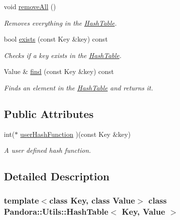 \begin{DoxyCompactItemize}
void \hyperlink{classPandora_1_1Utils_1_1HashTable_af541b0c8a7ababea86db5cfda3da0a2e}{removeAll} ()
\begin{DoxyCompactList}\small\item\em Removes everything in the \hyperlink{classPandora_1_1Utils_1_1HashTable}{HashTable}. \item\end{DoxyCompactList}\item 
bool \hyperlink{classPandora_1_1Utils_1_1HashTable_a61bb5ce54f3380c10edebb59cac114cd}{exists} (const Key \&key) const 
\begin{DoxyCompactList}\small\item\em Checks if a key exists in the \hyperlink{classPandora_1_1Utils_1_1HashTable}{HashTable}. \item\end{DoxyCompactList}\item 
Value \& \hyperlink{classPandora_1_1Utils_1_1HashTable_ab1aae3564898a1de7870930f7e678de0}{find} (const Key \&key) const 
\begin{DoxyCompactList}\small\item\em Finds an element in the \hyperlink{classPandora_1_1Utils_1_1HashTable}{HashTable} and returns it. \item\end{DoxyCompactList}\end{DoxyCompactItemize}
\subsection*{Public Attributes}
\begin{DoxyCompactItemize}
\item 
int($\ast$ \hyperlink{classPandora_1_1Utils_1_1HashTable_a88e480f18940fcecb6d1f8b034986c6d}{userHashFunction} )(const Key \&key)
\begin{DoxyCompactList}\small\item\em A user defined hash function. \item\end{DoxyCompactList}\end{DoxyCompactItemize}


\subsection{Detailed Description}
\subsubsection*{template$<$class Key, class Value$>$ class Pandora::Utils::HashTable$<$ Key, Value $>$}


